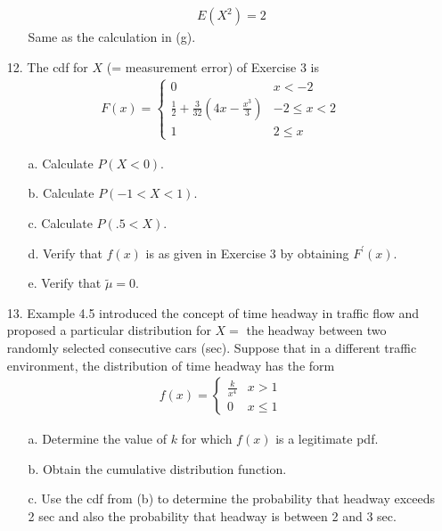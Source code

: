 \documentclass[letterpaper,12pt]{article}
\begin{document}
\begin{enumerate}
\begin{enumerate}
        \begin{align*}
          E(X^2) = 2
        \end{align*}
        Same as the calculation in (g).
    \end{enumerate}
  \item[12.]
    The cdf for $X$ (= measurement error) of Exercise 3 is
    \begin{align*}
      F(x) = \begin{cases}
        0                                                         & x < -2 \\
        \frac{1}{2} + \frac{3}{32}\left(4x - \frac{x^3}{3}\right) & -2 \le x < 2 \\
        1                                                         & 2 \le x
      \end{cases}
    \end{align*}
    \begin{enumerate}
      \item[a.]
        Calculate $P(X < 0)$.
      \item[b.]
        Calculate $P(-1 < X < 1)$.
      \item[c.]
        Calculate $P(.5 < X)$.
      \item[d.]
        Verify that $f(x)$ is as given in Exercise 3 by obtaining $F^\prime(x)$.
      \item[e.]
        Verify that $\tilde{\mu} = 0$.
    \end{enumerate}
  \item[13.]
    Example 4.5 introduced the concept of time headway in traffic flow and proposed a particular distribution for $X =$ the headway between two randomly selected consecutive cars (sec). Suppose that in a different traffic environment, the distribution of time headway has the form
    \begin{align*}
      f(x) = \begin{cases}
        \frac{k}{x^4} & x > 1 \\
        0             & x \le 1
      \end{cases}
    \end{align*}
    \begin{enumerate}
      \item[a.]
        Determine the value of $k$ for which $f(x)$ is a legitimate pdf.
      \item[b.]
        Obtain the cumulative distribution function.
      \item[c.]
        Use the cdf from (b) to determine the probability that headway exceeds 2 sec and also the probability that headway is between 2 and 3 sec.

\end{enumerate}
\end{enumerate}
\end{document}
